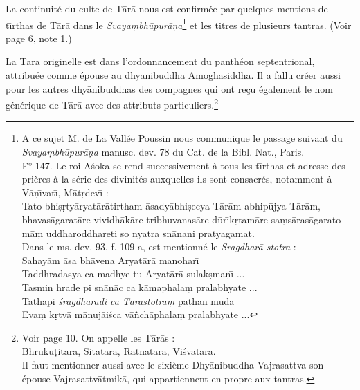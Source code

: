 \documentclass[a4paper, 11pt, oneside, french, landscape, twocolumn]{article}
\begin{document}
La continuité du culte de T\={a}r\={a} nous est confirmée par quelques mentions de t\={\i}rthas de T\={a}r\={a} dans le \emph{Svaya\d{m}bh\={u}pur\={a}\d{n}a}\footnote{A ce sujet M. de La Vallée Poussin nous communique le passage suivant du \emph{Svaya\d{m}bh\={u}pur\={a}\d{n}a} manusc. dev. 78 du Cat. de la Bibl. Nat., Paris.\\\hspace*{5mm}F° 147. Le roi A\'{s}oka se rend successivement à tous les t\={\i}rthas et adresse des prières à la série des divinités auxquelles ils sont consacrés, notamment à V\={a}\d{n}\={\i}vat\={\i}, M\={a}t\d{r}dev\={\i} :\\\hspace*{5mm}Tato bhi\d{s}\d{r}ty\={a}ryat\={a}r\={a}tirtham \={a}sady\={a}bhi\d{s}ecya T\={a}r\={a}m abhip\={u}jya T\={a}r\={a}m, bhavas\={a}garat\={a}re vividh\={a}k\={a}re tribhuvanas\={a}re d\={u}r\={\i}k\d{r}tam\={a}re sa\d{m}s\={a}ras\={a}garato m\={a}\d{m} uddharoddhareti so nyatra sn\={a}nani pratyagamat.\\\hspace*{5mm}Dans le ms. dev. 93, f. 109 a, est mentionné le \emph{Sragdhar\={a} stotra} :\\\hspace*{10mm}Sahay\={a}m \={a}sa bh\={a}vena \={A}ryat\={a}r\={a} manohar\={\i}\\\hspace*{10mm}Taddhradasya ca madhye tu \={A}ryat\={a}r\={a} sulak\d{s}ma\d{n}\={\i} ...\\\hspace*{10mm}Tasmin hrade pi sn\={a}n\={a}c ca k\={a}maphala\d{m} pralabhyate ...\\\hspace*{10mm}Tath\={a}pi \emph{\'{s}ragdhar\={a}di ca T\={a}r\={a}stotra\d{m}} pa\d{t}han mud\={a}\\\hspace*{10mm}Eva\d{m} k\d{r}tv\={a} m\={a}nuj\={a}i\'{s}ca v\={a}\~{n}ch\={a}phala\d{m} pralabhyate ...} et les titres de plusieurs tantras. (Voir page 6, note 1.)

La T\={a}r\={a} originelle est dans l'ordonnancement du panthéon septentrional, attribuée comme épouse au dhy\={a}nibuddha Amoghasiddha. Il a fallu créer aussi pour les autres dhy\={a}nibuddhas des compagnes qui ont reçu également le nom générique de T\={a}r\={a} avec des attributs particuliers.\footnote{Voir page 10. On appelle les T\={a}r\={a}s :\\\hspace*{10mm}Bhr\={u}ku\d{t}it\={a}r\={a}, Sitat\={a}r\={a}, Ratnat\={a}r\={a}, Vi\'{s}vat\={a}r\={a}.\\\hspace*{5mm}Il faut mentionner aussi avec le sixième Dhy\={a}nibuddha Vajrasattva son épouse Vajrasattv\={a}tmik\={a}, qui appartiennent en propre aux tantras.}
\end{document}

